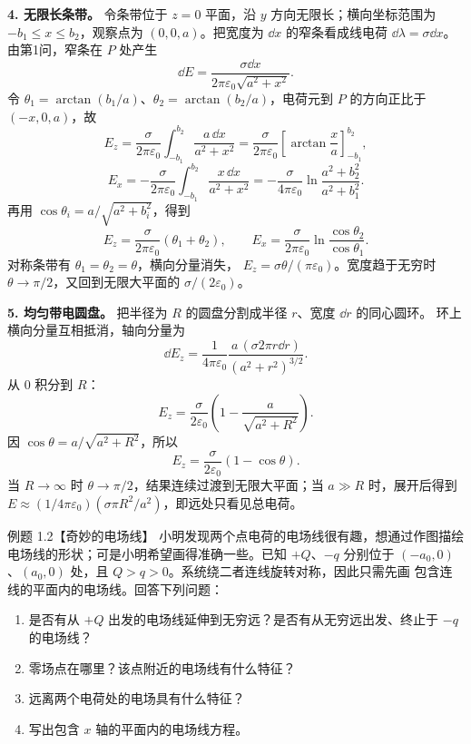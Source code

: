 \begin{xesolution}
\textbf{4. 无限长条带。} 令条带位于 $z=0$ 平面，沿 $y$ 方向无限长；横向坐标范围为
$-b_1\le x\le b_2$，观察点为 $(0,0,a)$。把宽度为 $\dd x$ 的窄条看成线电荷
$\dd\lambda=\sigma\dd x$。由第1问，窄条在 $P$ 处产生
\[
  \dd E=\frac{\sigma\dd x}{2\pi\varepsilon_0\sqrt{a^2+x^2}}.
\]
令 $\theta_1=\arctan(b_1/a)$、$\theta_2=\arctan(b_2/a)$，电荷元到 $P$ 的方向正比于 $(-x,0,a)$，故
\[
 E_z=\frac{\sigma}{2\pi\varepsilon_0}\int_{-b_1}^{b_2}\frac{a\,\dd x}{a^2+x^2}
 =\frac{\sigma}{2\pi\varepsilon_0}\left[\arctan\frac xa\right]_{-b_1}^{b_2},
\]
\[
 E_x=-\frac{\sigma}{2\pi\varepsilon_0}\int_{-b_1}^{b_2}\frac{x\,\dd x}{a^2+x^2}
 =-\frac{\sigma}{4\pi\varepsilon_0}\ln\frac{a^2+b_2^2}{a^2+b_1^2}.
\]
再用 $\cos\theta_i=a/\sqrt{a^2+b_i^2}$，得到
\[
  \boxed{E_z=\frac{\sigma}{2\pi\varepsilon_0}(\theta_1+\theta_2)},
  \qquad
  \boxed{E_x=\frac{\sigma}{2\pi\varepsilon_0}
  \ln\frac{\cos\theta_2}{\cos\theta_1}}.
\]
对称条带有 $\theta_1=\theta_2=\theta$，横向分量消失，
$E_z=\sigma\theta/(\pi\varepsilon_0)$。宽度趋于无穷时 $\theta\to\pi/2$，又回到无限大平面的
$\sigma/(2\varepsilon_0)$。

\textbf{5. 均匀带电圆盘。} 把半径为 $R$ 的圆盘分割成半径 $r$、宽度 $\dd r$ 的同心圆环。
环上横向分量互相抵消，轴向分量为
\[
  \dd E_z=\frac{1}{4\pi\varepsilon_0}
  \frac{a\,(\sigma 2\pi r\dd r)}{(a^2+r^2)^{3/2}}.
\]
从 $0$ 积分到 $R$：
\[
  E_z=\frac{\sigma}{2\varepsilon_0}
  \left(1-\frac{a}{\sqrt{a^2+R^2}}\right).
\]
因 $\cos\theta=a/\sqrt{a^2+R^2}$，所以
\[
  \boxed{E_z=\frac{\sigma}{2\varepsilon_0}(1-\cos\theta)}.
\]
当 $R\to\infty$ 时 $\theta\to\pi/2$，结果连续过渡到无限大平面；当 $a\gg R$ 时，展开后得到
$E\approx(1/4\pi\varepsilon_0)(\sigma\pi R^2/a^2)$，即远处只看见总电荷。
\end{xesolution}

\begin{origexamplebox}{例题 1.2【奇妙的电场线】}
小明发现两个点电荷的电场线很有趣，想通过作图描绘电场线的形状；可是小明希望画得准确一些。已知
$+Q$、$-q$ 分别位于 $(-a_0,0)$、$(a_0,0)$ 处，且 $Q>q>0$。系统绕二者连线旋转对称，因此只需先画
包含连线的平面内的电场线。回答下列问题：
\begin{enumerate}[label=\arabic*.]
  \item 是否有从 $+Q$ 出发的电场线延伸到无穷远？是否有从无穷远出发、终止于 $-q$ 的电场线？
  \item 零场点在哪里？该点附近的电场线有什么特征？
  \item 远离两个电荷处的电场具有什么特征？
  \item 写出包含 $x$ 轴的平面内的电场线方程。
\end{enumerate}
\end{origexamplebox}

